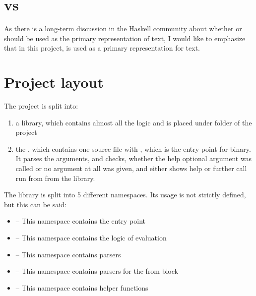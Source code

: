 \section{ vs }
As there is a long-term discussion in the Haskell community about whether  or  should be used as the 
primary representation of text, I would like to emphasize that in this project,  is used as a primary
representation for text.

\section{Project layout}

The project is split into:
\begin{enumerate}
  \item a library, which contains almost all the logic and is placed under
        folder of the project

  \item the , which contains one source file
      with , which is the entry point for  binary. 
      It parses the arguments, and checks, whether the help optional argument was called or no argument at all was given, 
      and either shows help or further call run from  from the library.
\end{enumerate}

The library is split into 5 different namespaces. Its usage is not strictly defined, but this can be said:
\begin{itemize}
    \item {} -- This namespace contains the entry point
    \item {} -- This namespace contains the logic of evaluation
    \item {} -- This namespace contains parsers
    \item {} -- This namespace contains parsers for the from block
    \item {} -- This namespace contains helper functions
\end{itemize}


